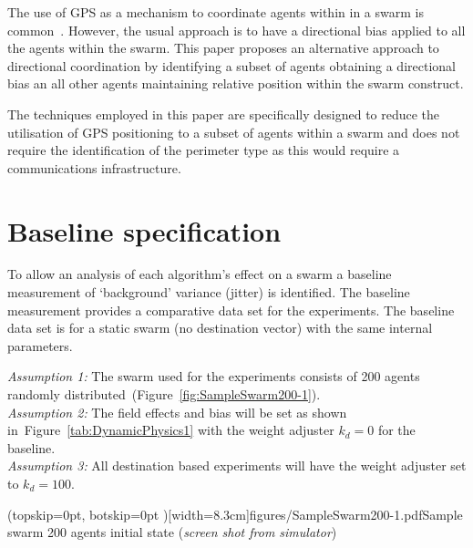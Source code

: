 \documentclass{ieeeaccess}
\begin{document}
The use of GPS as a mechanism to coordinate agents within in a swarm is common~\cite{SG:15,TG:12,AZHMJJM:12,MPYV:02,LAA:13,RRSTM:15}. However, the usual approach is to have a directional bias applied to all the agents within the swarm. This paper proposes an alternative approach to directional coordination by identifying a subset of agents obtaining a directional bias an all other agents maintaining relative position within the swarm construct.  

The techniques employed in this paper are specifically designed to reduce the utilisation of GPS positioning to a subset of agents within a swarm and does not require the identification of the perimeter type as this would require a communications infrastructure.

\section{Baseline specification}\label{sec:Baseline}
To allow an analysis of each algorithm's effect on a swarm a baseline measurement of `background' variance (jitter) is identified. The baseline measurement provides a comparative data set for the experiments. The baseline data set is for a static swarm (no destination vector) with the same internal parameters.

\noindent\textit{Assumption 1:} The swarm used for the experiments consists of 200 agents randomly distributed~(Figure~\ref{fig:SampleSwarm200-1}).\\ 
\textit{Assumption 2:} The field effects and bias will be set as shown in~Figure~\ref{tab:DynamicPhysics1} with the weight adjuster $k_d = 0$ for the baseline.\\
\textit{Assumption 3:} All destination based experiments will have the weight adjuster set to $k_d = 100$.


\Figure[t!](topskip=0pt, botskip=0pt )[width=8.3cm]{figures/SampleSwarm200-1.pdf}{Sample swarm 200 agents initial state (\textit{screen shot from simulator})\label{fig:SampleSwarm200-1}}
\end{document}
